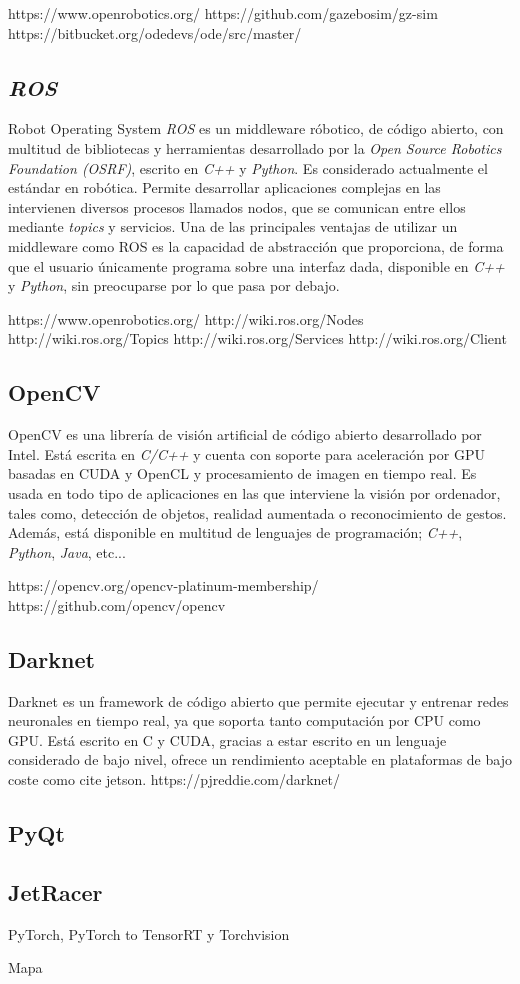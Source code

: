 https://www.openrobotics.org/
https://github.com/gazebosim/gz-sim
https://bitbucket.org/odedevs/ode/src/master/

\subsection{\textit{ROS}}
Robot Operating System \textit{ROS} es un middleware róbotico, de código abierto, con multitud de bibliotecas y herramientas desarrollado por la \textit{Open Source Robotics Foundation (OSRF)}, escrito en \textit{C++} y \textit{Python}. Es considerado actualmente el estándar en robótica. Permite desarrollar aplicaciones complejas en las intervienen diversos procesos llamados nodos, que se comunican entre ellos mediante \textit{topics} y servicios. Una de las principales ventajas de utilizar un middleware como ROS es la capacidad de abstracción que proporciona, de forma que el usuario únicamente programa sobre una interfaz dada, disponible en \textit{C++} y \textit{Python}, sin preocuparse por lo que pasa por debajo.

https://www.openrobotics.org/
http://wiki.ros.org/Nodes
http://wiki.ros.org/Topics
http://wiki.ros.org/Services
http://wiki.ros.org/Client%

\subsection{OpenCV}
OpenCV es una librería de visión artificial de código abierto desarrollado por Intel. Está escrita en \textit{C/C++} y cuenta con soporte para aceleración por GPU basadas en CUDA y OpenCL y procesamiento de imagen en tiempo real. Es usada en todo tipo de aplicaciones en las que interviene la visión por ordenador, tales como, detección de objetos, realidad aumentada o reconocimiento de gestos. Además, está disponible en multitud de lenguajes de programación; \textit{C++}, \textit{Python}, \textit{Java}, etc...

https://opencv.org/opencv-platinum-membership/
https://github.com/opencv/opencv

\subsection{Darknet}
Darknet es un framework de código abierto que permite ejecutar y entrenar redes neuronales en tiempo real, ya que soporta tanto computación por CPU como GPU. Está escrito en C y CUDA, gracias a estar escrito en un lenguaje considerado de bajo nivel, ofrece un rendimiento aceptable en plataformas de bajo coste como cite jetson.
https://pjreddie.com/darknet/

\subsection{PyQt}

\subsection{JetRacer}
PyTorch, PyTorch to TensorRT y Torchvision



Mapa 